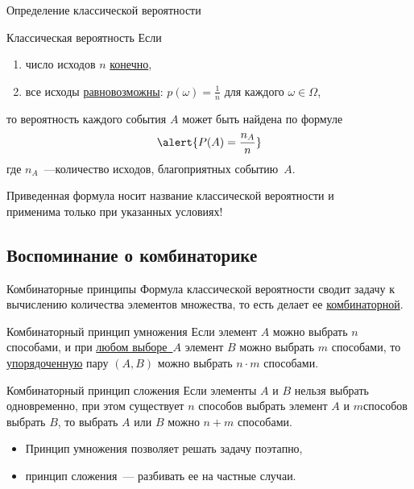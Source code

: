 \documentclass[unicode,11pt,notheorems,xcolor=table]{beamer}
\begin{document}
\begin{frame}{Определение классической вероятности}{}
    \begin{block}{Классическая вероятность}
    Если 
    \begin{enumerate}
        \item число исходов $n$ \underline{конечно},
        \item все исходы \underline{равновозможны}: $p(\omega)=\frac{1}{n}$  для каждого $\omega \in \Omega$,
    \end{enumerate}
    то вероятность каждого события $A$ может быть найдена по формуле
    $$
        \alert{P(A) = \frac{n_A}{n}}
    $$
    где $n_A$~---количество исходов, благоприятных событию~$A$.
\end{block}

Приведенная формула носит название классической вероятности и\\ \alert{\Large применима только при указанных условиях!}
\end{frame}

\subsection{Воспоминание о комбинаторике}
\begin{frame}{Комбинаторные принципы}{}
    Формула классической вероятности сводит задачу к вычислению количества элементов множества, то есть делает ее \underline{комбинаторной}.

    \begin{block}{Комбинаторный принцип умножения}
        Если элемент \alert{$A$} можно выбрать \alert{$n$} способами, и при \underline{любом выборе~\alert{$A$}} элемент \alert{$B$} можно выбрать \alert{$m$} способами, то \underline{упорядоченную} пару \alert{$(A, B)$} можно выбрать \alert{$n\cdot m$} способами.
    \end{block}

    \begin{block}{Комбинаторный принцип сложения}
        Если элементы \alert{$A$} и \alert{$B$} нельзя выбрать одновременно, при этом существует \alert{$n$} способов выбрать элемент \alert{$A$} и \alert{$m$}способов выбрать \alert{$B$}, то выбрать \alert{$A$ или $B$} можно \alert{$n + m$} способами. 
    \end{block}

    \begin{itemize}
        \item Принцип умножения позволяет решать задачу поэтапно,
        \item принцип сложения~--- разбивать ее на частные случаи.
    \end{itemize}
\end{frame}
\end{document}
